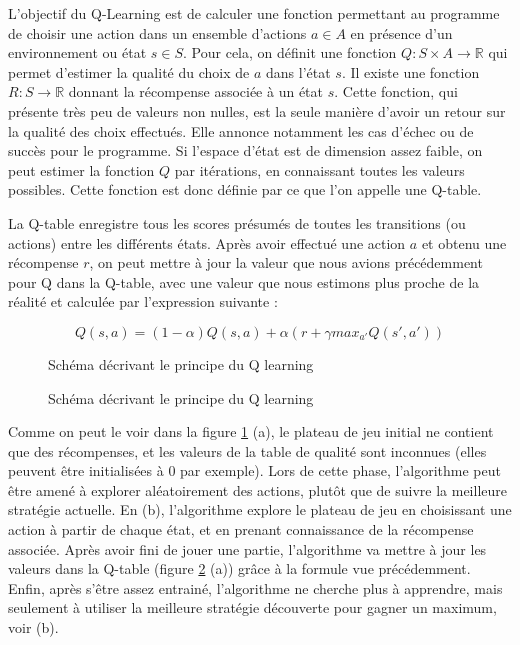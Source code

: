 \documentclass[
    10pt,
    a4paper,
    oneside,
    headinclude,footinclude,
    BCOR=5mm,
    captions=tableabove
]{scrartcl}
\begin{document}
L'objectif du Q-Learning est de calculer une fonction permettant au programme de choisir une action dans un ensemble d'actions $a \in A$ en présence d'un environnement ou état $s \in S$. Pour cela, on définit une fonction $Q: S \times A \rightarrow \mathbb{R}$ qui permet d'estimer la qualité du choix de $a$ dans l'état $s$. Il existe une fonction $R: S \rightarrow \mathbb{R}$ donnant la récompense associée à un état $s$. Cette fonction, qui présente très peu de valeurs non nulles, est la seule manière d'avoir un retour sur la qualité des choix effectués. Elle annonce notamment les cas d'échec ou de succès pour le programme. Si l'espace d'état est de dimension assez faible, on peut estimer la fonction $Q$ par itérations, en connaissant toutes les valeurs possibles. Cette fonction est donc définie par ce que l'on appelle une Q-table.

La Q-table enregistre tous les scores présumés de toutes les transitions (ou actions) entre les différents états. Après avoir effectué une action $a$ et obtenu une récompense $r$, on peut mettre à jour la valeur que nous avions précédemment pour Q dans la Q-table, avec une valeur que nous estimons plus proche de la réalité et calculée par l'expression suivante :

$$Q(s,a) = (1-\alpha) Q(s,a) + \alpha (r + \gamma max_{a'} Q(s',a') )$$

\begin{figure}[h!]
\centering
\caption{Schéma décrivant le principe du Q learning}
\label{fig:Qlearning.png}
\end{figure}

\begin{figure}[h!]
\centering
\caption{Schéma décrivant le principe du Q learning}
\label{fig:Qlearning2.png}
\end{figure}

Comme on peut le voir dans la figure \ref{fig:Qlearning.png} (a), le plateau de jeu initial ne contient que des récompenses, et les valeurs de la table de qualité sont inconnues (elles peuvent être initialisées à 0 par exemple). Lors de cette phase, l'algorithme peut être amené à explorer aléatoirement des actions, plutôt que de suivre la meilleure stratégie actuelle.
En (b), l'algorithme explore le plateau de jeu en choisissant une action à partir de chaque état, et en prenant connaissance de la récompense associée.
Après avoir fini de jouer une partie, l'algorithme va mettre à jour les valeurs dans la Q-table (figure \ref{fig:Qlearning2.png} (a)) grâce à la formule vue précédemment.
Enfin, après s'être assez entrainé, l'algorithme ne cherche plus à apprendre, mais seulement à utiliser la meilleure stratégie découverte pour gagner un maximum, voir (b).
\end{document}
